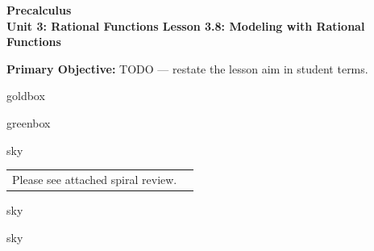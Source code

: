 \documentclass[10pt]{article}
\newcommand{\CourseName}{Precalculus}
\newcommand{\UnitNumberName}{Unit 3: Rational Functions \quad}
\newcommand{\LessonNumberName}{Lesson 3.8: Modeling with Rational Functions}
\begin{document}
\begin{center}
    {\Large\bfseries \CourseName \\
    {\small\bfseries \UnitNumberName \LessonNumberName}}
\end{center}

\begin{tcolorbox}[colback=sky, colframe=navy, boxrule=0.9pt, arc=2mm,
    left=2mm, right=2mm, top=1.5mm, bottom=1.5mm]
    \textbf{Primary Objective:} TODO --- restate the lesson aim in student terms.
\end{tcolorbox}

\renewcommand{\arraystretch}{1.6}
\begin{skillbox}{goldbox}
\end{skillbox}

\begin{skillbox}{greenbox}
\end{skillbox}

\begin{skillbox}{sky}
    \begin{tabularx}{\linewidth}{@{}X c@{}}
        \begin{minipage}[t]{0.55\linewidth}\vspace{0pt}
            Please see attached spiral review.  %
        \end{minipage}
        &
        \begin{minipage}[t]{0.38\linewidth}\vspace{0pt}\centering
        \end{minipage}
    \end{tabularx}
\end{skillbox}

\begin{skillbox}[Hook]{sky}
\end{skillbox}

\begin{skillbox}[Lesson]{sky}
\end{skillbox}
\end{document}
